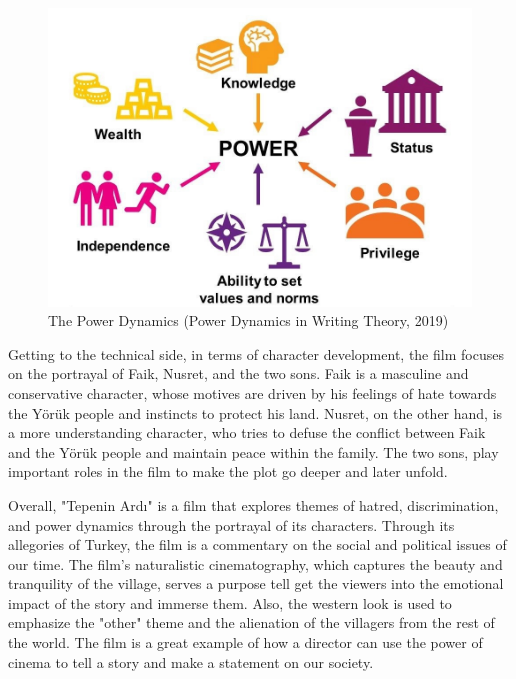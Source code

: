\documentclass[12pt]{article}
\begin{document}
\begin{figure}[h]
        \begin{center}
                \includegraphics[width=120mm,scale=0.5]{power}
                \caption{The Power Dynamics (Power Dynamics in Writing Theory, 2019)}
        \end{center}
\end{figure}

\FloatBarrier

\par
Getting to the technical side, in terms of character development, the film focuses on the portrayal of Faik, Nusret, and the two sons. Faik is a masculine and conservative character, whose motives are driven by his feelings of hate towards the Yörük people and instincts to protect his land. Nusret, on the other hand, is a more understanding character, who tries to defuse the conflict between Faik and the Yörük people and maintain peace within the family. The two sons, play important roles in the film to make the plot go deeper and later unfold.
\\
\par
Overall, "Tepenin Ardı" is a film that explores themes of hatred, discrimination, and power dynamics through the portrayal of its characters. Through its allegories of Turkey, the film is a commentary on the social and political issues of our time. The film's naturalistic cinematography, which captures the beauty and tranquility of the village, serves a purpose tell get the viewers into the emotional impact of the story and immerse them. Also, the western look is used to emphasize the "other" theme and the alienation of the villagers from the rest of the world. The film is a great example of how a director can use the power of cinema to tell a story and make a statement on our society.
\end{document}
